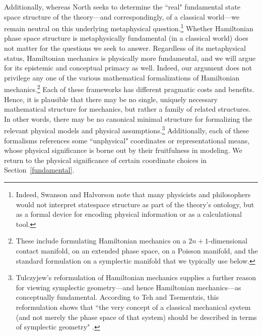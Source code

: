 \documentclass[letterpaper]{article}
\begin{document}
Additionally, whereas North \parencites*[76]{North} seeks to determine the ``real" fundamental state space structure of the theory---and correspondingly, of a classical world---we remain neutral on this underlying metaphysical question.\footnote{Indeed, Swanson and Halvorson \parencites*[]{Swanson} note that many physicists and philosophers would not interpret statespace structure as part of the theory's ontology, but as a formal device for encoding physical information or as a calculational tool.} Whether Hamiltonian phase space structure is metaphysically fundamental (in a classical world) does not matter for the questions we seek to answer. Regardless of its metaphysical status, Hamiltonian mechanics is physically more fundamental, and we will argue for its epistemic and conceptual primacy as well. Indeed, our argument does not privilege any one of the various mathematical formalizations of Hamiltonian mechanics.\footnote{These include formulating Hamiltonian mechanics on a $2n+1$-dimensional contact manifold, on an extended phase space, on a Poisson manifold, and the standard formulation on a symplectic manifold that we typically use below.} Each of these frameworks has different pragmatic costs and benefits. Hence, it is plausible that there may be no single, uniquely necessary mathematical structure for mechanics, but rather a family of related structures. In other words, there may be no canonical minimal structure for formalizing the relevant physical models and physical assumptions.\footnote{Tulczyjew's reformulation of Hamiltonian mechanics supplies a further reason for viewing symplectic geometry---and hence Hamiltonian mechanics---as conceptually fundamental. According to Teh and Tsementzis, this reformulation shows that  ``the very concept of a classical mechanical system (and not merely the phase space of that system) should be described in terms of symplectic geometry" \parencites*[46]{Teh}.}  Additionally, each of these formalisms references some ``unphysical" coordinates or representational means, whose physical significance is borne out by their fruitfulness in modeling. We return to the physical significance of certain coordinate choices in Section~\ref{fundamental}.
\end{document}
